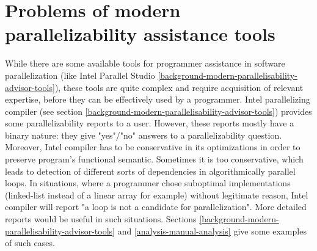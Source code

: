 \section{Problems of modern parallelizability assistance tools}
\null\qquad While there are some available tools for programmer assistance in software parallelization (like Intel Parallel Studio \ref{background-modern-parallelisability-advisor-tools}), these tools are quite complex and require acquisition of relevant expertise, before they can be effectively used by a programmer. Intel parallelizing compiler (see section \ref{background-modern-parallelisability-advisor-tools}) provides some parallelizability reports to a user. However, these reports mostly have a binary nature: they give "yes"/"no" answers to a parallelizability question. Moreover, Intel compiler has to be conservative in its optimizations in order to preserve program's functional semantic. Sometimes it is too conservative, which leads to detection of different sorts of dependencies in algorithmically parallel loops. In situations, where a programmer chose suboptimal implementations (linked-list instead of a linear array for example) without legitimate reason, Intel compiler will report "a loop is not a candidate for parallelization". More detailed reports would be useful in such situations. Sections \ref{background-modern-parallelisability-advisor-tools} and \ref{analysis-manual-analysis} give some examples of such cases.\newline
